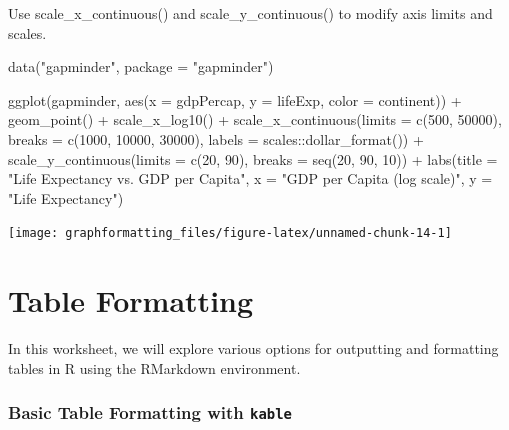 \documentclass[
]{book}
\newenvironment{Shaded}{\begin{snugshade}}{\end{snugshade}}
\newcommand{\AttributeTok}[1]{\textcolor[rgb]{0.77,0.63,0.00}{#1}}
\newcommand{\DecValTok}[1]{\textcolor[rgb]{0.00,0.00,0.81}{#1}}
\newcommand{\FunctionTok}[1]{\textcolor[rgb]{0.00,0.00,0.00}{#1}}
\newcommand{\NormalTok}[1]{#1}
\newcommand{\SpecialCharTok}[1]{\textcolor[rgb]{0.00,0.00,0.00}{#1}}
\newcommand{\StringTok}[1]{\textcolor[rgb]{0.31,0.60,0.02}{#1}}
\begin{document}
Use scale\_x\_continuous() and scale\_y\_continuous() to modify axis limits and scales.

\begin{Shaded}
\begin{Highlighting}[]
\FunctionTok{data}\NormalTok{(}\StringTok{"gapminder"}\NormalTok{, }\AttributeTok{package =} \StringTok{"gapminder"}\NormalTok{)}

\FunctionTok{ggplot}\NormalTok{(gapminder, }\FunctionTok{aes}\NormalTok{(}\AttributeTok{x =}\NormalTok{ gdpPercap, }\AttributeTok{y =}\NormalTok{ lifeExp, }\AttributeTok{color =}\NormalTok{ continent)) }\SpecialCharTok{+}
  \FunctionTok{geom\_point}\NormalTok{() }\SpecialCharTok{+}
  \FunctionTok{scale\_x\_log10}\NormalTok{() }\SpecialCharTok{+}
  \FunctionTok{scale\_x\_continuous}\NormalTok{(}\AttributeTok{limits =} \FunctionTok{c}\NormalTok{(}\DecValTok{500}\NormalTok{, }\DecValTok{50000}\NormalTok{), }\AttributeTok{breaks =} \FunctionTok{c}\NormalTok{(}\DecValTok{1000}\NormalTok{, }\DecValTok{10000}\NormalTok{, }\DecValTok{30000}\NormalTok{), }\AttributeTok{labels =}\NormalTok{ scales}\SpecialCharTok{::}\FunctionTok{dollar\_format}\NormalTok{()) }\SpecialCharTok{+}
  \FunctionTok{scale\_y\_continuous}\NormalTok{(}\AttributeTok{limits =} \FunctionTok{c}\NormalTok{(}\DecValTok{20}\NormalTok{, }\DecValTok{90}\NormalTok{), }\AttributeTok{breaks =} \FunctionTok{seq}\NormalTok{(}\DecValTok{20}\NormalTok{, }\DecValTok{90}\NormalTok{, }\DecValTok{10}\NormalTok{)) }\SpecialCharTok{+}
  \FunctionTok{labs}\NormalTok{(}\AttributeTok{title =} \StringTok{"Life Expectancy vs. GDP per Capita"}\NormalTok{,}
       \AttributeTok{x =} \StringTok{"GDP per Capita (log scale)"}\NormalTok{,}
       \AttributeTok{y =} \StringTok{"Life Expectancy"}\NormalTok{)}
\end{Highlighting}
\end{Shaded}

\texttt{[image: graphformatting\_files/figure-latex/unnamed-chunk-14-1]}

\hypertarget{table-formatting}{%
\chapter{Table Formatting}\label{table-formatting}}

In this worksheet, we will explore various options for outputting and formatting tables in R using the RMarkdown environment.

\hypertarget{basic-table-formatting-with-kable}{%
\subsection{\texorpdfstring{Basic Table Formatting with \texttt{kable}}{Basic Table Formatting with kable}}\label{basic-table-formatting-with-kable}}
\end{document}

